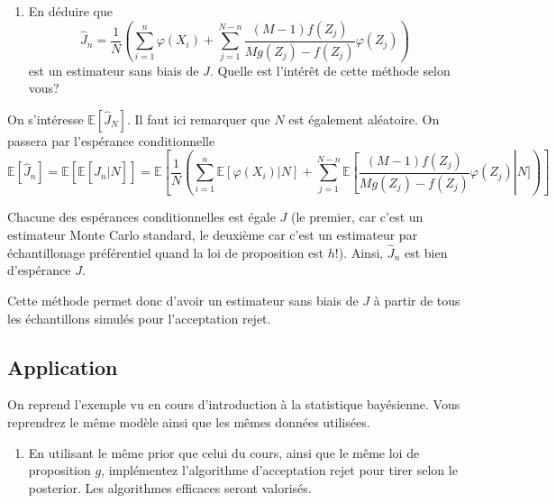 \documentclass[]{article}
\providecommand{\tightlist}{%
  \setlength{\itemsep}{0pt}\setlength{\parskip}{0pt}}
\newenvironment{Correction}%
  { \vspace{\baselineskip}\begin{mdframed}[backgroundcolor=my_green]}%
  {\end{mdframed}}
\begin{document}
\begin{enumerate}
\def\labelenumi{\arabic{enumi}.}
\setcounter{enumi}{5}
\tightlist
\item
  En déduire que
  \[\hat{J}_n = \frac{1}{N} \left(\sum_{i = 1}^n \varphi(X_i) + \sum_{j = 1}^{N - n} \frac{(M - 1)f(Z_j)}{Mg(Z_j) - f(Z_j)} \varphi(Z_j) \right)\]
  est un estimateur sans biais de \(J\). Quelle est l'intérêt de cette
  méthode selon vous?
\end{enumerate}

\begin{Correction}

On s'intéresse $\mathbb{E}[\hat{J}_N]$. Il faut ici remarquer que $N$ est également aléatoire. 
On passera par l'espérance conditionnelle
$$\mathbb{E}\left[\hat{J}_n\right] = \mathbb{E}\left[\mathbb{E}\left[\hat{J}_n\vert N\right] \right] = \mathbb{E}\left[ \frac{1}{N} \left(\sum_{i = 1}^n \mathbb{E}[\varphi(X_i)\vert N] + \sum_{j = 1}^{N - n} \mathbb{E}\left[\frac{(M - 1)f(Z_j)}{Mg(Z_j) - f(Z_j)} \varphi(Z_j)\right \vert N] \right) \right]$$

Chacune des espérances conditionnelles est égale $J$ (le premier, car c'est un estimateur Monte Carlo standard, le deuxième car c'est un estimateur par échantillonage préférentiel quand la loi de proposition est $h$!). Ainsi, $\hat{J}_n$ est bien d'espérance $J$. 

Cette méthode permet donc d'avoir un estimateur sans biais de $J$ à partir de tous les échantillons simulés pour l'acceptation rejet.
\end{Correction}

\hypertarget{application}{%
\subsection{Application}\label{application}}

On reprend l'exemple vu en cours d'introduction à la statistique
bayésienne. Vous reprendrez le même modèle ainsi que les mêmes données
utilisées.

\begin{enumerate}
\def\labelenumi{\arabic{enumi}.}
\setcounter{enumi}{6}
\tightlist
\item
  En utilisant le même prior que celui du cours, ainsi que le même loi
  de proposition \(g\), implémentez l'algorithme d'acceptation rejet
  pour tirer selon le posterior. Les algorithmes efficaces seront
  valorisés.
\end{enumerate}
\end{document}
